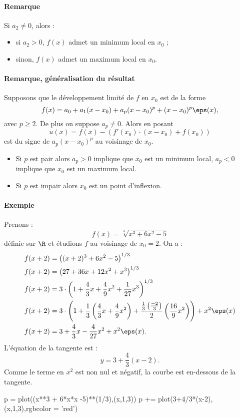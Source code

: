 \paragraph{Remarque}Si $a_2\neq 0$, alors :
\begin{itemize}
\item si $a_2>0$, $f(x)$ admet un minimum local en $x_0$ ;
\item sinon, $f(x)$ admet un maximum local en $x_0$.
\end{itemize}

\paragraph{Remarque, généralisation du résultat}Supposons que le développement limité de $f$ en $x_0$ est de la forme \[ f(x) = a_0 + a_1(x-x_0) + a_p(x-x_0)^{p} + (x-x_0)^{p}\eps(x),\]avec $p\geq 2$. De plus on suppose $a_p\neq 0$. Alors en posant \[u(x) = f(x) - (f'(x_0)\cdot(x-x_0) + f(x_0))\]est du signe de $a_p(x - x_0)^{p}$ au voisinage de $x_0$.
\begin{itemize}
\item Si $p$ est pair alors $a_p>0$ implique que $x_0$ est un minimum local,  $a_p <0$ implique que $x_0$ est un maximum local.
\item Si $p$ est impair alors $x_0$ est un point d'inflexion.
\end{itemize}

\paragraph{Exemple}
Prenons : \[f(x) = \sqrt[3]{x^{3} + 6x^{2} -5} \]définie sur $\R$ et étudions $f$ au voisinage de $x_0 = 2$.
On a :
\begin{align*}
f(x+2) &= \left( (x+2)^{3} + 6x^{2} - 5\right)^{1/3} \\
f(x+2) &= \left( 27 + 36x + 12x^{2} + x^{3}\right)^{1/3}\\
f(x+2) &= 3\cdot \left( 1 + \frac{4}{3}x + \frac{4}{9}x^{2} + \frac{1}{27}x^{3}\right)^{1/3} \\
f(x+2) &= 3\cdot\left( 1 + \frac{1}{3}\left( \frac{4}{3}x + \frac{4}{9}x^{2} \right) + \frac{\frac{1}{3}\left(\frac{-2}{3}\right)}{2}\left(\frac{16}{9}x^{2}\right) \right)+ x^{2}\eps(x)\\
f(x+2) &= 3 + \frac{4}{3}x - \frac{4}{27}x^{2} + x^{2}\eps(x).
\end{align*}
L'équation de la tangente est : \[ y = 3 + \frac{4}{3}(x-2).\]Comme le terme en $x^{2}$ est non nul et négatif, la courbe est en-dessous de la tangente.
\begin{sagesilent}
p = plot((x**3 + 6*x*x -5)**(1/3),(x,1,3))
p += plot(3+4/3*(x-2),(x,1,3),rgbcolor = 'red')
\end{sagesilent}
\begin{center}
\end{center}


